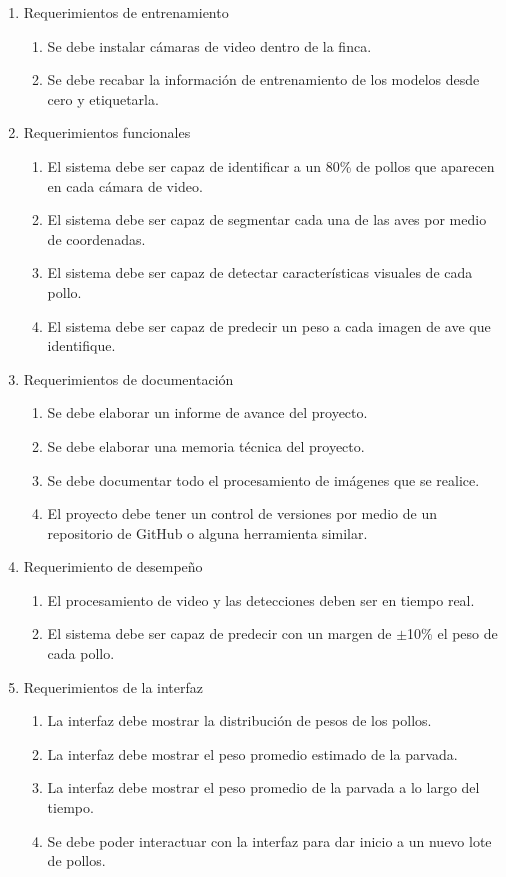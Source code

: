 \documentclass[
11pt, %
]{charter}
\begin{document}
\begin{enumerate}
	\item Requerimientos de entrenamiento
		\begin{enumerate}
		\item Se debe instalar cámaras de video dentro de la finca.
		\item Se debe recabar la información de entrenamiento de los modelos desde cero y etiquetarla.
		\end{enumerate}
	\item Requerimientos funcionales
		\begin{enumerate}
		\item El sistema debe ser capaz de identificar a un 80\% de pollos que aparecen en cada cámara de video.
		\item El sistema debe ser capaz de segmentar cada una de las aves por medio de coordenadas.
		\item El sistema debe ser capaz de detectar características visuales de cada pollo.
		\item El sistema debe ser capaz de predecir un peso a cada imagen de ave que identifique.
		\end{enumerate}
	\item Requerimientos de documentación
		\begin{enumerate}
		\item Se debe elaborar un informe de avance del proyecto.
		\item Se debe elaborar una memoria técnica del proyecto.
		\item Se debe documentar todo el procesamiento de imágenes que se realice.
		\item El proyecto debe tener un control de versiones por medio de un repositorio de GitHub o alguna herramienta similar.
		\end{enumerate}
	\item Requerimiento de desempeño
		\begin{enumerate}
		\item El procesamiento de video y las detecciones deben ser en tiempo real.
		\item El sistema debe ser capaz de predecir con un margen de $\pm$10\% el peso de cada pollo.
		\end{enumerate}
	\item Requerimientos de la interfaz
		\begin{enumerate}
		\item La interfaz debe mostrar la distribución de pesos de los pollos.
		\item La interfaz debe mostrar el peso promedio estimado de la parvada.
		\item La interfaz debe mostrar el peso promedio de la parvada a lo largo del tiempo.
		\item Se debe poder interactuar con la interfaz para dar inicio a un nuevo lote de pollos.
		\end{enumerate}
\end{enumerate}
\end{document}
